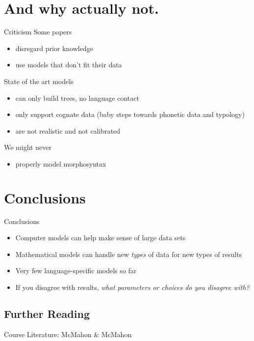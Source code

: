 \documentclass[9pt]{beamer}
\begin{document}
\section{And why actually not.}
\begin{frame}{Criticism}
  Some papers
  \begin{itemize}
  \item disregard prior knowledge
  \item use models that don't fit their data
  \end{itemize}
  \pause
  State of the art models
  \begin{itemize}
  \item can only build trees, no language contact
  \item only support cognate data (baby steps towards phonetic data and typology)
  \item are not realistic and not calibrated
  \end{itemize}
  \pause
  We might never
  \begin{itemize}
  \item properly model morphosyntax
  \end{itemize}
\end{frame}
\section{Conclusions}
\begin{frame}{Conclusions}
  \begin{itemize}
  \item Computer models can help make sense of large data sets
  \item Mathematical models can handle new \emph{types} of data for new types of results
  \item Very few language-specific models so far
  \item If you disagree with results, \emph{what parameters or choices do you disagree with?}
  \end{itemize}
\end{frame}
\subsection{Further Reading}
\begin{frame}
  Course
  Literature: McMahon \& McMahon
\end{frame}
\end{document}
